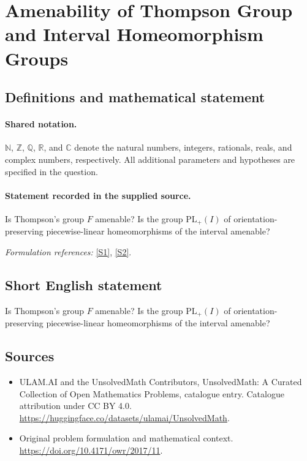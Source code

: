 \documentclass[11pt]{article}
\newcommand{\sref}[2]{\hyperlink{source:#1:#2}{[S#2]}}
\begin{document}
\section{Amenability of Thompson Group and Interval Homeomorphism Groups}\label{statement}

\subsection{Definitions and mathematical statement}

\paragraph{Shared notation.}$\mathbb N$, $\mathbb Z$, $\mathbb Q$, $\mathbb R$, and $\mathbb C$ denote the natural numbers, integers, rationals, reals, and complex numbers, respectively. All additional parameters and hypotheses are specified in the question.


\paragraph{Statement recorded in the supplied source.}
Is Thompson's group $F$ amenable? Is the group $\mathrm{PL}_+(I)$ of orientation-preserving piecewise-linear homeomorphisms of the interval amenable?
\par\smallskip\textit{Formulation references:} \sref{statement}{1}, \sref{statement}{2}.
\subsection{Short English statement}
Is Thompson's group $F$ amenable? Is the group $\mathrm{PL}_+(I)$ of orientation-preserving piecewise-linear homeomorphisms of the interval amenable?
\subsection{Sources}
\begin{itemize}
\item[\hypertarget{source:statement:1}{S1}] ULAM.AI and the UnsolvedMath Contributors, UnsolvedMath: A Curated Collection of Open Mathematics Problems, catalogue entry. Catalogue attribution under CC BY 4.0.
\url{https://huggingface.co/datasets/ulamai/UnsolvedMath}.
\item[\hypertarget{source:statement:2}{S2}] Original problem formulation and mathematical context.
\url{https://doi.org/10.4171/owr/2017/11}.
\end{itemize}
\label{end:statement}
\end{document}
